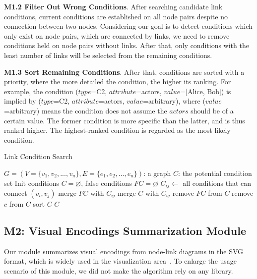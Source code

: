 \noindent \textbf{M1.2 Filter Out Wrong Conditions}.
After searching candidate link conditions, current conditions are established on all node pairs despite no connection between two nodes.
Considering our goal is to detect conditions which only exist on node pairs, which are connected by links, we need to remove conditions held on node pairs without links. After that, only conditions with the least number of links will be selected from the remaining conditions.

\noindent \textbf{M1.3 Sort Remaining Conditions}.
After that, conditions are sorted with a priority, 
where the more detailed the condition, the higher its ranking.
For example, the condition ($type$=C2, $attribute$=actors, $value$=[Alice, Bob]) is implied by ($type$=C2, $attribute$=actors, $value$=arbitrary), where ($value$=arbitrary) means the condition does not assume the $actors$ should be of a certain value.
The former condition is more specific than the latter, and is thus ranked higher.
The highest-ranked condition is regarded as the most likely condition.

\begin{algorithm}[tp]
    \renewcommand\arraystretch{1.2}
    \caption{ Link Condition Search }
    \setlength{\belowcaptionskip}{-15pt}
    \label{alg:conditions}
    \begin{algorithmic}[1]
        \Require
            $G=(V=\{v_1, v_2, ..., v_n\}, E=\{e_1, e_2, ..., e_n\})$: a graph
        \Ensure
            $C$: the potential condition set
        \State Init conditions $C=\varnothing$, false conditions $FC=\varnothing$
            \State $C_{ij} \gets$ all conditions that can connect $(v_i, v_j)$
                \State merge $FC$ with $C_{ij}$
            \Else
                \State merge $C$ with $C_{ij}$
            \EndIf
        \EndFor
        \State remove $FC$ from $C$
                \State remove $c$ from $C$
            \EndIf
        \EndFor
        \State sort $C$
        \State \Return $C$
    \end{algorithmic}
\end{algorithm}

\subsection{\textbf{M2: }Visual Encodings Summarization Module}\label{sec:visualencodings}
Our module summarizes visual encodings from node-link diagrams in the SVG format, which is widely used in the visualization area~\cite{DBLP:journals/tvcg/BostockOH11, sievert2017plotly, DBLP:journals/vi/WangBLDFPC21}.
To enlarge the usage scenario of this module, we did not make the algorithm rely on any library.

